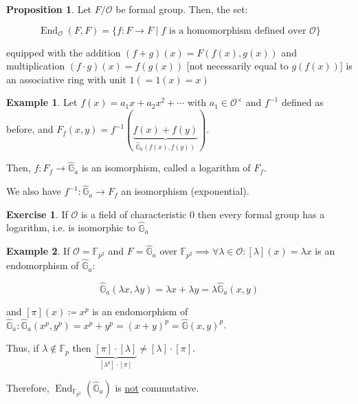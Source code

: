 \documentclass[openany]{amsbook}
\numberwithin{section}{chapter}
\theoremstyle{definition}
\newtheorem*{example}{Example}
\newtheorem*{exercise}{Exercise}
\newtheorem{proposition}[theorem]{Proposition}
\begin{document}
\begin{proposition}
    Let \(F / \mathcal{O}\) be  formal group. Then, the set:

    \[
        \operatorname{End}_{\mathcal{O}}(F,F) = \{ f: F \to F \mid f \text{ is a homomorphism defined over } \mathcal{O} \}
    \]

    equipped with the addition \((f+g)(x) = F(f(x),g(x))\) and multiplication \((f \cdot g)(x) = f(g(x))\) [not necessarily equal to \(g(f(x))\)] is an associative ring with unit \(1 (= 1(x) = x)\) 
\end{proposition}

\begin{example}
    Let \(f(x) = a_1 x + a_2 x^2 + \cdots\) with \(a_1 \in \mathcal{O}^\times\) and \(f ^{-1}\) defined as before, and \(F_f(x,y) = f ^{-1} (\underbrace{f(x)+f(y)}_{\widehat{\mathbb{G}}_a(f(x),f(y))})\).

    Then, \(f: F_f \to \widehat{\mathbb{G}}_a\) is an isomorphism, called a logarithm of \(F_f\).

    We also have \(f ^{-1} : \widehat{\mathbb{G}}_a \to F_f\) an isomorphism (exponential).
\end{example}

\begin{exercise}
    If \(\mathcal{O}\) is a field of characteristic \(0\) then every formal group has a logarithm, i.e. is isomorphic to \(\widehat{\mathbb{G}}_a\) 
\end{exercise}

\begin{example}
    If \(\mathcal{O} = \mathbb{F}_{p^2}\) and \(F = \widehat{\mathbb{G}}_a\) over \(\mathbb{F}_{p^2} \implies \forall \lambda \in \mathcal{O} : [\lambda](x) = \lambda x\) is an endomorphism of \(\widehat{\mathbb{G}}_a\):

    \[
        \widehat{\mathbb{G}}_a(\lambda x, \lambda y) = \lambda x + \lambda y = \lambda \widehat{\mathbb{G}}_a(x,y)
    \]

    and \([\pi](x) \coloneqq x^p\) is an endomorphism of \(\widehat{\mathbb{G}}_a: \widehat{\mathbb{G}}_a(x^p,y^p)=x^p + y^p = (x+y)^p = \widehat{\mathbb{G}}(x,y)^p\).
    
    Thus, if \(\lambda \notin \mathbb{F}_p\) then \(\underbrace{[\pi] \cdot [\lambda]}_{[\lambda^p]\cdot [\pi]} \neq [\lambda]\cdot [\pi]\).

    Therefore, \(\operatorname{End}_{\mathbb{F}_{p^2}}(\widehat{\mathbb{G}}_a)\) is \underline{not} commutative.
\end{example}
\end{document}
